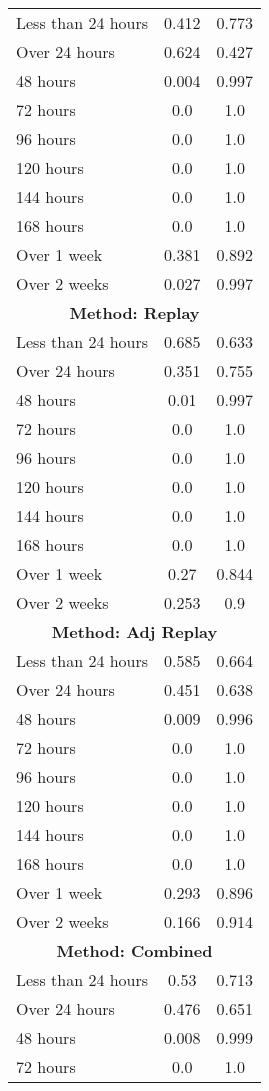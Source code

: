 \documentclass{article}
\begin{document}
\begin{longtable}{lcc}
\midrule
Less than 24 hours & 0.412 & 0.773 \\
Over 24 hours & 0.624 & 0.427 \\
48 hours & 0.004 & 0.997 \\
72 hours & 0.0 & 1.0 \\
96 hours & 0.0 & 1.0 \\
120 hours & 0.0 & 1.0 \\
144 hours & 0.0 & 1.0 \\
168 hours & 0.0 & 1.0 \\
Over 1 week & 0.381 & 0.892 \\
Over 2 weeks & 0.027 & 0.997 \\
\midrule
\multicolumn{3}{c}{\textbf{Method: Replay}} \\
\midrule
Less than 24 hours & 0.685 & 0.633 \\
Over 24 hours & 0.351 & 0.755 \\
48 hours & 0.01 & 0.997 \\
72 hours & 0.0 & 1.0 \\
96 hours & 0.0 & 1.0 \\
120 hours & 0.0 & 1.0 \\
144 hours & 0.0 & 1.0 \\
168 hours & 0.0 & 1.0 \\
Over 1 week & 0.27 & 0.844 \\
Over 2 weeks & 0.253 & 0.9 \\
\midrule
\multicolumn{3}{c}{\textbf{Method: Adj Replay}} \\
\midrule
Less than 24 hours & 0.585 & 0.664 \\
Over 24 hours & 0.451 & 0.638 \\
48 hours & 0.009 & 0.996 \\
72 hours & 0.0 & 1.0 \\
96 hours & 0.0 & 1.0 \\
120 hours & 0.0 & 1.0 \\
144 hours & 0.0 & 1.0 \\
168 hours & 0.0 & 1.0 \\
Over 1 week & 0.293 & 0.896 \\
Over 2 weeks & 0.166 & 0.914 \\
\midrule
\multicolumn{3}{c}{\textbf{Method: Combined}} \\
\midrule
Less than 24 hours & 0.53 & 0.713 \\
Over 24 hours & 0.476 & 0.651 \\
48 hours & 0.008 & 0.999 \\
72 hours & 0.0 & 1.0 \\

\end{longtable}
\end{document}

